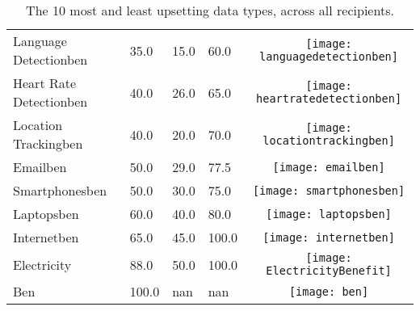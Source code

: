 \begin{table}[t]
\begin{center}
\begin{tabular}{| p{2cm} | p{1cm} | p{1cm} | p{1cm} | c |}
Language Detectionben & 35.0 & 15.0 & 60.0 & \texttt{[image: languagedetectionben]} \\ 
Heart Rate Detectionben & 40.0 & 26.0 & 65.0 & \texttt{[image: heartratedetectionben]} \\ 
Location Trackingben & 40.0 & 20.0 & 70.0 & \texttt{[image: locationtrackingben]} \\ 
Emailben & 50.0 & 29.0 & 77.5 & \texttt{[image: emailben]} \\ 
Smartphonesben & 50.0 & 30.0 & 75.0 & \texttt{[image: smartphonesben]} \\ 
Laptopsben & 60.0 & 40.0 & 80.0 & \texttt{[image: laptopsben]} \\ 
Internetben & 65.0 & 45.0 & 100.0 & \texttt{[image: internetben]} \\ 
Electricity & 88.0 & 50.0 & 100.0 & \texttt{[image: ElectricityBenefit]} \\ 
Ben & 100.0 & nan & nan & \texttt{[image: ben]} \\ 
\hline
\end{tabular}
\caption{The 10 most and least upsetting data types, across all recipients.}
\label{top10}
\end{center}
\end{table}
